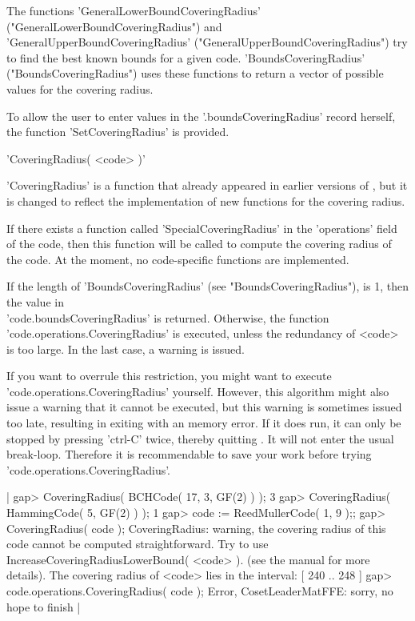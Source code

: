 The functions 'GeneralLowerBoundCoveringRadius'
("GeneralLowerBoundCoveringRadius") and\\ 
'GeneralUpperBoundCoveringRadius'
("GeneralUpperBoundCoveringRadius")
try to find the best known bounds for a given code.
'BoundsCoveringRadius' ("BoundsCoveringRadius") uses these
functions to return a vector of possible values for the
covering radius.

To allow the user to enter values in the '.boundsCoveringRadius'
record herself, the function 'SetCoveringRadius' is provided.




'CoveringRadius( <code> )'

'CoveringRadius' is a function that already appeared in earlier
versions of \GUAVA, but it is changed to reflect the implementation
of new functions for the covering radius.

If there exists a function called 'SpecialCoveringRadius' in the
'operations' field of the code, then this function will be called to
compute the covering radius of the code.
At the moment, no code-specific functions are implemented.

If the length of 'BoundsCoveringRadius' (see "BoundsCoveringRadius"),
is 1, then the value in\\ 
'code.boundsCoveringRadius' is returned.
Otherwise, the function\\
'code.operations.CoveringRadius' is executed,
unless the redundancy of <code> is too large.
In the last case, a warning is issued.

If you want to overrule this restriction, you might
want to execute\\
'code.operations.CoveringRadius' yourself.
However, this algorithm might also issue a warning that it
cannot be executed, but this warning is sometimes issued too late,
resulting in \GAP{} exiting with an memory error.  
If it does run, it can only be stopped by pressing 'ctrl-C' twice,
thereby quitting \GAP.  It will not enter the usual break-loop.
Therefore it is recommendable to save your work before trying
'code.operations.CoveringRadius'.

|    gap> CoveringRadius( BCHCode( 17, 3, GF(2) ) );
    3
    gap> CoveringRadius( HammingCode( 5, GF(2) ) );
    1
    gap> code := ReedMullerCode( 1, 9 );;
    gap> CoveringRadius( code );
    CoveringRadius: warning, the covering radius of
    this code cannot be computed straightforward.
    Try to use IncreaseCoveringRadiusLowerBound( <code> ).
    (see the manual for more details).
    The covering radius of <code> lies in the interval:
    [ 240 .. 248 ] 
    gap> code.operations.CoveringRadius( code );
    Error, CosetLeaderMatFFE: sorry, no hope to finish |


